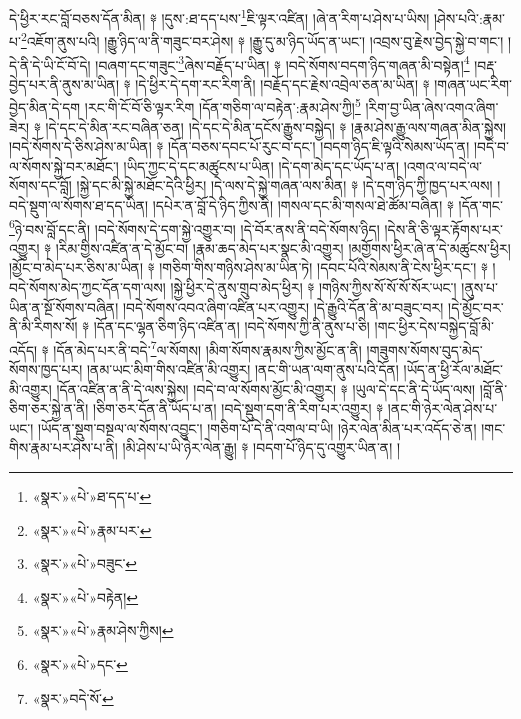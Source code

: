 དེ་ཕྱིར་རང་བློ་བཅས་དོན་མིན། ༈ །དུས་:ཐ་དད་པས་\footnote{«སྣར་»«པེ་»ཐ་དད་པ་}ཇི་ལྟར་འཛིན། །ཞེ་ན་རིག་པ་ཤེས་པ་ཡིས། །ཤེས་པའི་:རྣམ་པ་\footnote{«སྣར་»«པེ་»རྣམ་པར་}འཇོག་ནུས་པའི། །རྒྱུ་ཉིད་ལ་ནི་གཟུང་བར་ཤེས། ༈ །རྒྱུ་དུ་མ་ཉིད་ཡོད་ན་ཡང་། །འབྲས་བུ་རྗེས་བྱེད་སྐྱེ་བ་གང་། །དེ་ནི་དེ་ཡི་ངོ་བོ་དེ། །བཞག་དང་གཟུང་\footnote{«སྣར་»«པེ་»བཟུང་}ཞེས་བརྗོད་པ་ཡིན། ༈ །བདེ་སོགས་བདག་ཉིད་གཞན་མི་བསྟེན།\footnote{«སྣར་»«པེ་»བརྟེན།} །བརྡ་བྱེད་པར་ནི་ནུས་མ་ཡིན། ༈ །དེ་ཕྱིར་དེ་དག་རང་རིག་ནི། །བརྗོད་དང་རྗེས་འབྲེལ་ཅན་མ་ཡིན། ༈ །གཞན་ཡང་རིག་བྱེད་མིན་དེ་དག །རང་གི་ངོ་བོ་ཅི་ལྟར་རིག །དོན་གཅིག་ལ་བརྟེན་:རྣམ་ཤེས་ཀྱི།\footnote{«སྣར་»«པེ་»རྣམ་ཤེས་ཀྱིས།} །རིག་བྱ་ཡིན་ཞེས་འགའ་ཞིག་ཟེར། ༈ །དེ་དང་དེ་མིན་རང་བཞིན་ཅན། །དེ་དང་དེ་མིན་དངོས་རྒྱུས་བསྐྱེད། ༈ །རྣམ་ཤེས་རྒྱུ་ལས་གཞན་མིན་སྐྱེས། །བདེ་སོགས་དེ་ཅིས་ཤེས་མ་ཡིན། ༈ །དོན་བཅས་དབང་པོ་རུང་བ་དང་། །བདག་ཉིད་ཇི་ལྟའི་སེམས་ཡོད་ན། །བདེ་བ་ལ་སོགས་སྐྱེ་བར་མཐོང་། །ཡིད་ཀྱང་དེ་དང་མཚུངས་པ་ཡིན། །དེ་དག་མེད་དང་ཡོད་པ་ན། །འགའ་ལ་བདེ་ལ་སོགས་དང་བློ། །སྐྱེ་དང་མི་སྐྱེ་མཐོང་དེའི་ཕྱིར། །དེ་ལས་དེ་སྐྱེ་གཞན་ལས་མིན། ༈ །དེ་དག་ཉིད་ཀྱི་ཁྱད་པར་ལས། །བདེ་སྡུག་ལ་སོགས་ཐ་དད་ཡིན། །དཔེར་ན་བློ་དེ་ཉིད་ཀྱིས་ནི། །གསལ་དང་མི་གསལ་ཐེ་ཚོམ་བཞིན། ༈ །དོན་གང་\footnote{«སྣར་»«པེ་»དང་}ཉེ་བས་བློ་དང་ནི། །བདེ་སོགས་དེ་དག་སྐྱེ་འགྱུར་བ། །དེ་བོར་ནས་ནི་བདེ་སོགས་ཉིད། །དེས་ནི་ཅི་ལྟར་རྟོགས་པར་འགྱུར། ༈ །རིམ་གྱིས་འཛིན་ན་དེ་མྱོང་བ། །རྣམ་ཆད་མེད་པར་སྣང་མི་འགྱུར། །མགྱོགས་ཕྱིར་ཞེ་ན་དེ་མཚུངས་ཕྱིར། །མྱོང་བ་མེད་པར་ཅིས་མ་ཡིན། ༈ །གཅིག་གིས་གཉིས་ཤེས་མ་ཡིན་ཏེ། །དབང་པོའི་སེམས་ནི་ངེས་ཕྱིར་དང་། ༈ །བདེ་སོགས་མེད་ཀྱང་དོན་དག་ལས། །སྐྱེ་ཕྱིར་དེ་ནུས་གྲུབ་མེད་ཕྱིར། ༈ །གཉིས་ཀྱིས་སོ་སོ་སོ་སོར་ཡང་། །ནུས་པ་ཡིན་ན་སྔོ་སོགས་བཞིན། །བདེ་སོགས་འབའ་ཞིག་འཛིན་པར་འགྱུར། །དེ་རྒྱུའི་དོན་ནི་མ་བཟུང་བར། །དེ་མྱོང་བར་ནི་མི་རིགས་སོ། ༈ །དོན་དང་ལྷན་ཅིག་ཉིད་འཛིན་ན། །བདེ་སོགས་ཀྱི་ནི་ནུས་པ་ཅི། །གང་ཕྱིར་དེས་བསྐྱེད་བློ་མི་འདོད། ༈ །དོན་མེད་པར་ནི་བདེ་\footnote{«སྣར་»བདེ་སོ་}ལ་སོགས། །མིག་སོགས་རྣམས་ཀྱིས་མྱོང་ན་ནི། །གཟུགས་སོགས་བུད་མེད་སོགས་ཁྱད་པར། །ནམ་ཡང་མིག་གིས་འཛིན་མི་འགྱུར། །ནང་གི་ཡན་ལག་ནུས་པའི་དོན། །ཡོད་ན་ཕྱི་རོལ་མཐོང་མི་འགྱུར། །དོན་འཛིན་ན་ནི་དེ་ལས་སྐྱེས། །བདེ་བ་ལ་སོགས་མྱོང་མི་འགྱུར། ༈ །ཡུལ་དེ་དང་ནི་དེ་ཡོད་ལས། །བློ་ནི་ཅིག་ཅར་སྐྱེ་ན་ནི། །ཅིག་ཅར་དོན་ནི་ཡོད་པ་ན། །བདེ་སྡུག་དག་ནི་རིག་པར་འགྱུར། ༈ །ནང་གི་ཉེར་ལེན་ཤེས་པ་ཡང་། །ཡོད་ན་སྡུག་བསྔལ་ལ་སོགས་འབྱུང་། །གཅིག་པོ་དེ་ནི་འགལ་བ་ཡི། །ཉེར་ལེན་མིན་པར་འདོད་ཅེ་ན། །གང་གིས་རྣམ་པར་ཤེས་པ་ནི། །མི་ཤེས་པ་ཡི་ཉེར་ལེན་རྒྱུ། ༈ །བདག་པོ་ཉིད་དུ་འགྱུར་ཡིན་ན། །

